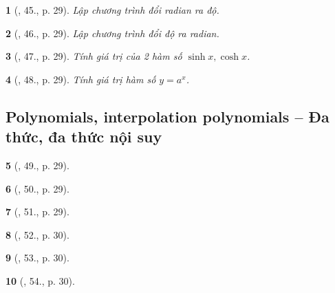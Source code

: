 \documentclass{article}
\newtheorem{baitoan}{}
\begin{document}
\begin{baitoan}[\cite{Doanh_Tuan_Pascal}, 45., p. 29]
	Lập chương trình đổi radian ra độ.
\end{baitoan}

\begin{baitoan}[\cite{Doanh_Tuan_Pascal}, 46., p. 29]
	Lập chương trình đổi độ ra radian.
\end{baitoan}

\begin{baitoan}[\cite{Doanh_Tuan_Pascal}, 47., p. 29]
	Tính giá trị của 2 hàm số $\sinh x,\cosh x$.
\end{baitoan}

\begin{baitoan}[\cite{Doanh_Tuan_Pascal}, 48., p. 29]
	Tính giá trị hàm số $y = a^x$.
\end{baitoan}


\subsection{Polynomials, interpolation polynomials -- Đa thức, đa thức nội suy}

\begin{baitoan}[\cite{Doanh_Tuan_Pascal}, 49., p. 29]
	
\end{baitoan}

\begin{baitoan}[\cite{Doanh_Tuan_Pascal}, 50., p. 29]
	
\end{baitoan}

\begin{baitoan}[\cite{Doanh_Tuan_Pascal}, 51., p. 29]
	
\end{baitoan}

\begin{baitoan}[\cite{Doanh_Tuan_Pascal}, 52., p. 30]
	
\end{baitoan}

\begin{baitoan}[\cite{Doanh_Tuan_Pascal}, 53., p. 30]
	
\end{baitoan}

\begin{baitoan}[\cite{Doanh_Tuan_Pascal}, 54., p. 30]
	
\end{baitoan}
\end{document}
